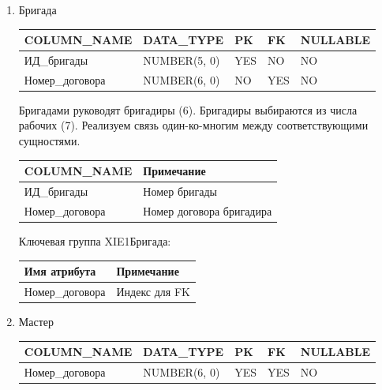 \begin{enumerate}
\begin{tabular}{|p{4cm}|p{5cm}|}
    \end{tabular}

    \item{Бригада}

    \begin{tabular}{|p{4cm}|p{3cm}|p{1cm}|p{1cm}|p{2cm}|} \hline

        {\bf COLUMN\_NAME} & {\bf DATA\_TYPE} & {\bf PK} & {\bf FK} & {\bf NULLABLE} \\ \hline
        ИД\_бригады & NUMBER(5, 0) & YES & NO & NO \\ \hline
        Номер\_договора & NUMBER(6, 0) & NO & YES & NO \\ \hline

    \end{tabular}

    Бригадами руководят бригадиры (6).
    Бригадиры выбираются из числа рабочих (7).
    Реализуем связь один-ко-многим между соответствующими сущностями.

    \begin{tabular}{|p{4cm}|p{5cm}|} \hline

        {\bf COLUMN\_NAME} & {\bf Примечание} \\ \hline
        ИД\_бригады & Номер бригады \\ \hline
        Номер\_договора & Номер договора бригадира \\ \hline

    \end{tabular}

    Ключевая группа XIE1Бригада:

    \begin{tabular}{|p{4cm}|p{5cm}|} \hline

        {\bf Имя атрибута} & {\bf Примечание} \\ \hline
        Номер\_договора & Индекс для FK \\ \hline

    \end{tabular}

    \item{Мастер}

    \begin{tabular}{|p{4cm}|p{3cm}|p{1cm}|p{1cm}|p{2cm}|} \hline

        {\bf COLUMN\_NAME} & {\bf DATA\_TYPE} & {\bf PK} & {\bf FK} & {\bf NULLABLE} \\ \hline
        Номер\_договора & NUMBER(6, 0) & YES & YES & NO \\ \hline


\end{tabular}
\end{enumerate}

